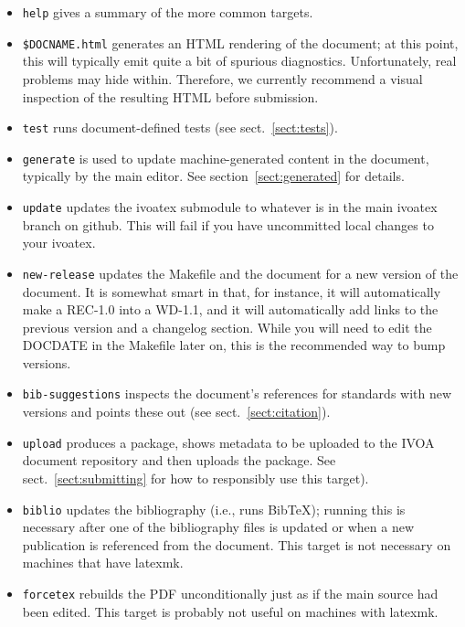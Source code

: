 \documentclass[11pt,a4paper]{ivoa}
\newcommand{\BibTeX}{Bib\TeX}
\begin{document}
\begin{itemize}
\item \texttt{help} gives a summary of the more common targets.

\item \texttt{\$DOCNAME.html} generates an HTML rendering of the
document; at this point, this will typically emit quite a bit of
spurious diagnostics.  Unfortunately, real problems may hide within.
Therefore, we currently recommend a visual inspection of the resulting
HTML before submission.

\item \texttt{test} runs document-defined tests (see
sect.~\ref{sect:tests}).

\item \texttt{generate} is used to update machine-generated content in
the document, typically by the main editor.  See
section~\ref{sect:generated} for details.

\item \texttt{update} updates the ivoatex submodule to whatever is in
the main ivoatex branch on github.  This will fail if you have
uncommitted local changes to your ivoatex.

\item \texttt{new-release} updates the Makefile and the document for a
new version of the document.  It is somewhat smart in that, for
instance, it will automatically make a REC-1.0 into a WD-1.1, and it
will automatically add links to the previous version and a changelog
section.  While you will need to edit the DOCDATE in the Makefile later on, this
is the recommended way to bump versions.

\item \texttt{bib-suggestions} inspects the document's references for
standards with new versions and points these out (see
sect.~\ref{sect:citation}).

\item \texttt{upload} produces a package, shows metadata to be uploaded to the
IVOA document repository and
then uploads the package. See sect.~\ref{sect:submitting} for how to
responsibly use this target).

\item \texttt{biblio} updates the bibliography (i.e., runs \BibTeX);
running this is necessary after one of the bibliography files is updated
or when a new publication is referenced from the document.  This target
is not necessary on machines that have latexmk.

\item \texttt{forcetex} rebuilds the PDF unconditionally just as if the
main source had been edited.  This target is probably not useful on
machines with latexmk.


\end{itemize}
\end{document}
